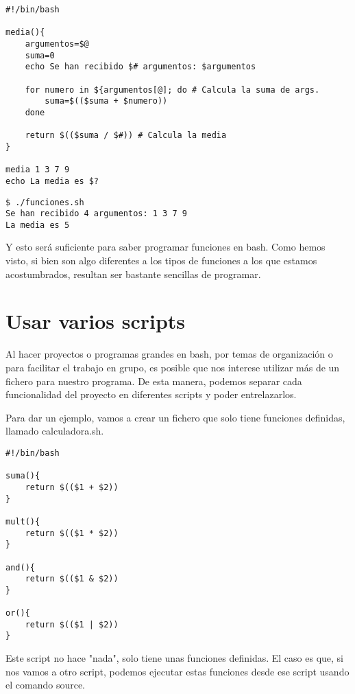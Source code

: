 \begin{tcolorbox-code}
\begin{lstlisting}
#!/bin/bash

media(){
	argumentos=$@
	suma=0
	echo Se han recibido $# argumentos: $argumentos

	for numero in ${argumentos[@]; do # Calcula la suma de args.
		suma=$(($suma + $numero))
	done

	return $(($suma / $#)) # Calcula la media
}

media 1 3 7 9
echo La media es $?
\end{lstlisting}
\end{tcolorbox-code}

\begin{tcolorbox-code}
\begin{lstlisting}
$ ./funciones.sh
Se han recibido 4 argumentos: 1 3 7 9
La media es 5
\end{lstlisting}
\end{tcolorbox-code}

Y esto será suficiente para saber programar funciones en bash. Como hemos visto, si bien son algo diferentes a los tipos de funciones a los que estamos acostumbrados, resultan ser bastante sencillas de programar.

\section{Usar varios scripts}
Al hacer proyectos o programas grandes en bash, por temas de organización o para facilitar el trabajo en grupo, es posible que nos interese utilizar más de un fichero para nuestro programa. De esta manera, podemos separar cada funcionalidad del proyecto en diferentes scripts y poder entrelazarlos.

Para dar un ejemplo, vamos a crear un fichero que solo tiene funciones definidas, llamado calculadora.sh.

\begin{tcolorbox-code}
\begin{lstlisting}
#!/bin/bash

suma(){
	return $(($1 + $2))
}

mult(){
	return $(($1 * $2))
}

and(){
	return $(($1 & $2))
}

or(){
	return $(($1 | $2))
}
\end{lstlisting}
\end{tcolorbox-code}
Este script no hace "nada", solo tiene unas funciones definidas. El caso es que, si nos vamos a otro script, podemos ejecutar estas funciones desde ese script usando el comando source.


